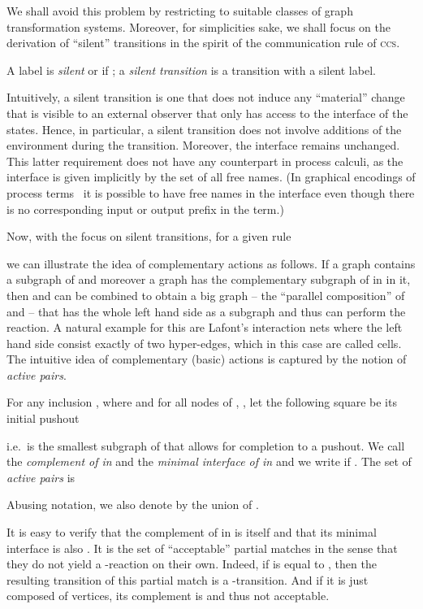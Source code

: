 We shall avoid this problem by restricting to suitable classes of graph transformation systems. 
Moreover, 
for simplicities sake, 
we shall focus on the derivation of ``silent'' transitions
in the spirit of the communication rule of \textsc{ccs}. 
\begin{definition}
  A label  is \emph{silent} or 
  if ;
  a \emph{silent transition} is a transition with a silent label. 
\end{definition}
  Intuitively, 
  a silent transition is one that does not induce any ``material''
  change that is visible to an external observer
  that only has access to  the interface of the states. 
  Hence, 
  in particular, 
  a silent transition does not involve additions of the environment
  during the transition.
  Moreover, 
  the interface remains unchanged. 
  This latter requirement does not have any counterpart 
  in process calculi, 
  as the interface is given implicitly by the set of all free names.
  (In graphical encodings of process terms~\cite{bonchi2009labelled}
  it is possible to have free names in the interface
  even though there is no corresponding input or output prefix in
  the term.)



  Now, with the focus on silent transitions,
  for a given rule
  
  we can illustrate the idea of complementary actions as follows.
  If a graph  contains a
  subgraph  of   and moreover a graph  has the complementary
  subgraph of  in  in it,
  then  and  can be combined to obtain a
  big graph  -- the ``parallel composition'' of  and  --
  that has the whole left hand side  as a subgraph
  and thus  can perform the reaction.
  {A natural example for this 
    are Lafont's interaction nets
    where the left hand side consist exactly of two hyper-edges, 
    which in this case are called cells.}
  The intuitive idea of complementary (basic) actions is 
  captured by the notion of \emph{active pairs}. 


\begin{definition} 
  For any inclusion , where  and for all nodes  of , , 
  let the following square be its initial pushout  
  
i.e.\  is the smallest subgraph of   that allows for completion to a pushout. 
We call  the \emph{complement of  in } and  the \emph{minimal interface of  in }
and we write  if . 
 The set of \emph{active pairs} is 
 
  Abusing notation, 
  we also denote by  the union of .  
\label{def:activepair}
\end{definition}
It is easy to verify that the complement of  in  is  itself and that its minimal interface is also .
It is the set of ``acceptable'' partial matches in the sense that they do not yield a -reaction on their own.
Indeed, if  is equal to , 
then the resulting transition of this partial match is a -transition.
And if it is just composed of vertices, its complement is 
and thus not acceptable.

